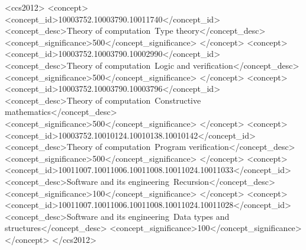 \documentclass[sigplan, screen, natbib=false]{acmart}
\begin{document}
\begin{CCSXML}
<ccs2012>
   <concept>
       <concept_id>10003752.10003790.10011740</concept_id>
       <concept_desc>Theory of computation~Type theory</concept_desc>
       <concept_significance>500</concept_significance>
       </concept>
   <concept>
       <concept_id>10003752.10003790.10002990</concept_id>
       <concept_desc>Theory of computation~Logic and verification</concept_desc>
       <concept_significance>500</concept_significance>
       </concept>
   <concept>
       <concept_id>10003752.10003790.10003796</concept_id>
       <concept_desc>Theory of computation~Constructive mathematics</concept_desc>
       <concept_significance>500</concept_significance>
       </concept>
   <concept>
       <concept_id>10003752.10010124.10010138.10010142</concept_id>
       <concept_desc>Theory of computation~Program verification</concept_desc>
       <concept_significance>500</concept_significance>
       </concept>
   <concept>
       <concept_id>10011007.10011006.10011008.10011024.10011033</concept_id>
       <concept_desc>Software and its engineering~Recursion</concept_desc>
       <concept_significance>100</concept_significance>
       </concept>
   <concept>
       <concept_id>10011007.10011006.10011008.10011024.10011028</concept_id>
       <concept_desc>Software and its engineering~Data types and structures</concept_desc>
       <concept_significance>100</concept_significance>
       </concept>
 </ccs2012>
\end{CCSXML}


\end{document}
